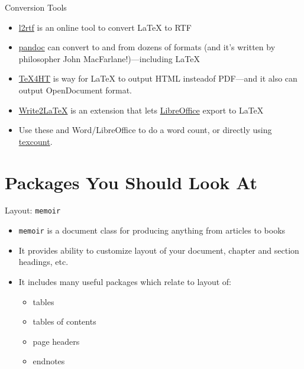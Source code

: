 \begin{frame}{Conversion Tools}

\begin{itemize}
\item \href{http://www.sciweavers.org/convert-latex-to-rtf}{l2rtf}
  is an online tool to convert \LaTeX{} to RTF
\item \href{http://johnmacfarlane.net/pandoc/}{pandoc} can convert to
  and from dozens of formats (and it's written by philosopher
  John MacFarlane!)---including \LaTeX
\item \href{http://www.tug.org/applications/tex4ht/mn.html}{TeX4HT} is
  way for \LaTeX{} to output HTML insteadof PDF---and it also can
  output OpenDocument format. 
\item
  \href{http://extensions.libreoffice.org/extension-center/writer2latex-1}{Write2LaTeX}
  is an extension that lets
  \href{http://www.libreoffice.org/}{LibreOffice} export to \LaTeX{}
\item Use these and Word/LibreOffice to do a word count, or directly
  using \href{http://app.uio.no/ifi/texcount/index.html}{texcount}.
\end{itemize}

\end{frame}




\section{Packages You Should Look At}


\begin{frame}{Layout: \texttt{memoir}}

\begin{itemize}
\item \texttt{memoir} is a document class for producing anything from
  articles to books
\item It provides ability to customize layout of your document,
  chapter and section headings, etc.
\item It includes many useful packages which relate to layout of:
\begin{itemize}
\item tables
\item tables of contents
\item page headers
\item endnotes
\end{itemize}
\end{itemize}

\end{frame}


